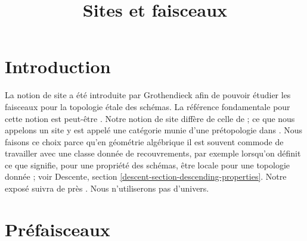

%


\title{Sites et faisceaux}


\maketitle

\label{section-phantom}

\tableofcontents

\section{Introduction}
\label{section-introduction}

\noindent
La notion de site a été introduite par Grothendieck afin de pouvoir étudier
les faisceaux pour la topologie \'etale des schémas. La référence fondamentale
pour cette notion est peut-être \cite{SGA4}. Notre notion de site diffère de
celle de \cite{SGA4} ; ce que nous appelons un site y est appelé une catégorie munie
d’une prétopologie dans \cite[Expos\'e II, D\'efinition 1.3]{SGA4}.
Nous faisons ce choix parce qu’en géométrie algébrique il est souvent commode de
travailler avec une classe donnée de recouvrements, par exemple lorsqu’on définit
ce que signifie, pour une propriété des schémas, être locale pour une topologie
donnée ; voir Descente, section \ref{descent-section-descending-properties}.
Notre exposé suivra de près \cite{ArtinTopologies}.
Nous n’utiliserons pas d’univers.












\section{Préfaisceaux}
\label{section-presheaves}


